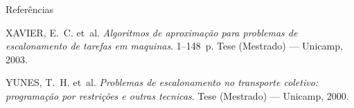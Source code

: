 \documentclass[]{beamer}
\begin{document}
\begin{frame}[allowframebreaks]{Referências}
\begin{thebibliography}{9}
		{XAVIER, E.~C. et~al.
		\emph{{Algoritmos de aproxima{\c{c}}{\~{a}}o para problemas de escalonamento de
		  tarefas em maquinas}}.
		1--148~p. Tese (Mestrado) --- Unicamp, 2003.}
		
		{YUNES, T.~H. et~al.
		\emph{{Problemas de escalonamento no transporte coletivo:
		  programa{\c{c}}{\~{a}}o por restri{\c{c}}{\~{o}}es e outras tecnicas}}.
		Tese (Mestrado) --- Unicamp, 2000.}
		
	\end{thebibliography}
  \end{frame}
\end{document}

